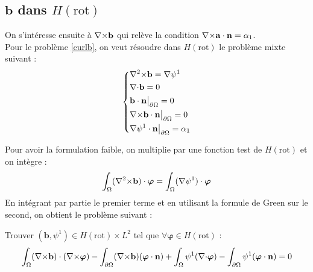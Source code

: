 \subsection{$\mathbf{b}$ dans $H(\mathrm{rot})$}
On s'intéresse ensuite à ${\nabla\times}\mathbf{b}$ qui relève la condition ${\nabla\times}\mathbf{a}\cdot\mathbf{n}=\alpha_1$.\\
Pour le problème \ref{curlb}, on veut résoudre dans $H(\mathrm{rot})$ le problème mixte suivant : 
\begin{equation*}
\left\{\begin{aligned}
&{\nabla^2\times} \mathbf{b} = {\nabla}\psi^1\\
&{\nabla\cdot} \mathbf{b} = 0\\
&\mathbf{b}\cdot \mathbf{n}{\big\rvert_{\partial\Omega}} = 0\\
&{\nabla\times} \mathbf{b}\cdot \mathbf{n}{\big\rvert_{\partial\Omega}} = 0\\
&{\nabla}\psi^1\cdot \mathbf{n}{\big\rvert_{\partial\Omega}} = \alpha_1
\end{aligned}\right.
\end{equation*}

Pour avoir la formulation faible, on multiplie par une fonction test de $H(\mathrm{rot})$ et on intègre :
\[ \int_\Omega ({\nabla^2\times} \mathbf{b})\cdot\bm{\varphi} = \int_\Omega ({\nabla}\psi^1)\cdot\bm{\varphi} \]
En intégrant par partie le premier terme et en utilisant la formule de Green sur le second, on obtient le problème suivant :
\begin{pb} \label{fvbcurl}
Trouver $(\mathbf{b},\psi^1)\in H(\mathrm{rot})\times L^2$ tel que $\forall \bm{\varphi}\in H(\mathrm{rot})$ :
\begin{equation*}
\int_\Omega ({\nabla\times} \mathbf{b})\cdot({\nabla\times}\bm{\varphi}) - \int_{\partial\Omega} ({\nabla\times} \mathbf{b})(\bm{\varphi}\cdot \mathbf{n}) + \int_\Omega \psi^1({\nabla\cdot}\bm{\varphi}) - \int_{\partial\Omega} \psi^1(\bm{\varphi}\cdot \mathbf{n}) = 0
\end{equation*}\end{pb}

